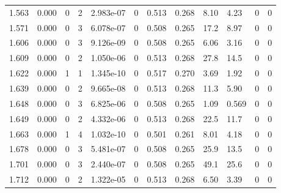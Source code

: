 \documentclass[preview]{standalone}
\begin{document}
{{{{\begin{tabular}{L{1.2cm}C{1.2cm} C{0.3cm}C{0.5cm} C{1.4cm}C{1.4cm} C{1.4cm}C{1.4cm} C{1.6cm}C{1.6cm} C{1.6cm}C{1.6cm}}
  1.563  &  0.000  & 0     &  2 &  2.983e-07  & 0  &  0.513&   0.268& 8.10 & 4.23   &  0 & 0  \\ 
  1.571  &  0.000  & 0     &  3 &  6.078e-07  & 0  &  0.508&   0.265& 17.2 & 8.97   &  0 & 0  \\ 
  1.606  &  0.000  & 0     &  3 &  9.126e-09  & 0  &  0.508&   0.265& 6.06 & 3.16   &  0 & 0  \\ 
  1.609  &  0.000  & 0     &  2 &  1.050e-06  & 0  &  0.513&   0.268& 27.8 & 14.5   &  0 & 0  \\ 
  1.622  &  0.000  & 1     &  1 &  1.345e-10  & 0  &  0.517&   0.270& 3.69 & 1.92   &  0 & 0  \\ 
  1.639  &  0.000  & 0     &  2 &  9.665e-08  & 0  &  0.513&   0.268& 11.3 & 5.90   &  0 & 0  \\ 
  1.648  &  0.000  & 0     &  3 &  6.825e-06  & 0  &  0.508&   0.265& 1.09 & 0.569   &  0 & 0  \\ 
  1.649  &  0.000  & 0     &  2 &  4.332e-06  & 0  &  0.513&   0.268& 22.5 & 11.7   &  0 & 0  \\ 
  1.663  &  0.000  & 1     &  4 &  1.032e-10  & 0  &  0.501&   0.261& 8.01 & 4.18   &  0 & 0  \\ 
  1.678  &  0.000  & 0     &  3 &  5.481e-07  & 0  &  0.508&   0.265& 25.9 & 13.5   &  0 & 0  \\ 
  1.701  &  0.000  & 0     &  3 &  2.440e-07  & 0  &  0.508&   0.265& 49.1 & 25.6   &  0 & 0  \\ 
  1.712  &  0.000  & 0     &  2 &  1.322e-05  & 0  &  0.513&   0.268& 6.50 & 3.39   &  0 & 0  \\ 
\hline 
\end{tabular} 

}}}}
\end{document}
